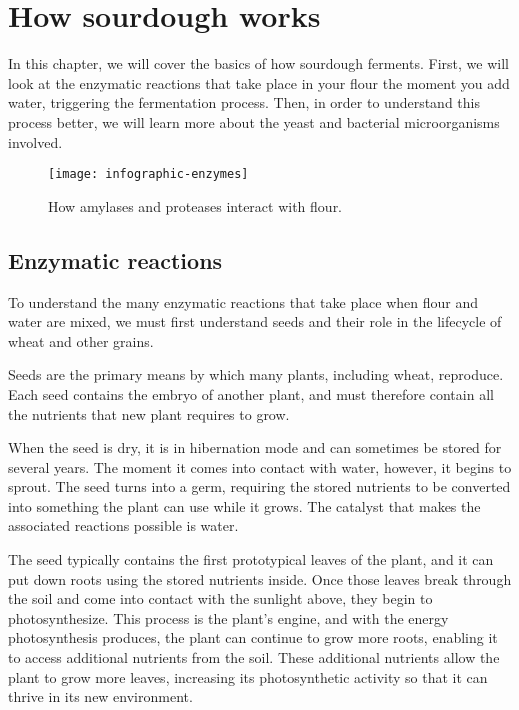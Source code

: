 \chapter{How sourdough works}%
\label{ch:how-sourdough-works}
\begin{quoting}
In this chapter, we will cover the basics of how sourdough ferments.
First, we will look at the enzymatic reactions that take place
in your flour the moment you add water, triggering the fermentation
process. Then, in order to understand this process better, we will
learn more about the yeast and bacterial microorganisms involved.
\end{quoting}

\begin{figure}[!htb]
  \texttt{[image: infographic-enzymes]}
  \caption[Interaction of amylases and flour]{How amylases and proteases
      interact with flour.}%
  \label{infographic-enzymes}
\end{figure}

\section{Enzymatic reactions}

To understand the many enzymatic reactions that take place when flour
and water are mixed, we must first understand seeds and their role in
the lifecycle of wheat and other grains.

Seeds are the primary means by which many plants, including wheat,
reproduce. Each seed contains the embryo of another plant, and must
therefore contain all the nutrients that new plant requires to grow.

When the seed is dry, it is in hibernation mode and can sometimes be
stored for several years. The moment it comes into contact with water,
however, it begins to sprout. The seed turns into a germ, requiring the
stored nutrients to be converted into something the plant can use while
it grows. The catalyst that makes the associated reactions possible is water.

The seed typically contains the first prototypical leaves of the plant,
and it can put down roots using the stored nutrients inside. Once those leaves
break through the soil and come into contact with the sunlight above, they
begin to photosynthesize. This process is the plant's engine, and with the
energy photosynthesis produces, the plant can continue to grow more roots,
enabling it to access additional nutrients from the soil. These additional
nutrients allow the plant to grow more leaves, increasing its photosynthetic
activity so that it can thrive in its new environment.

